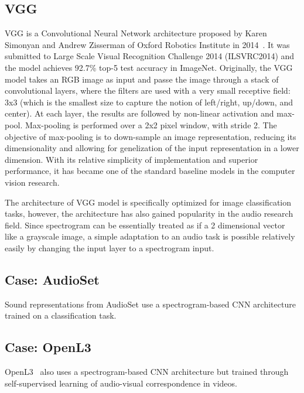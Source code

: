 
\subsection{VGG}
VGG is a Convolutional Neural Network architecture proposed by Karen Simonyan and Andrew Zisserman of Oxford Robotics Institute in 2014~\cite{simonyan2015}. It was submitted to Large Scale Visual Recognition Challenge 2014 (ILSVRC2014) and the model achieves 92.7\% top-5 test accuracy in ImageNet.
Originally, the VGG model takes an RGB image as input and passe the image through a stack of convolutional layers, where the filters are used with a very small receptive field: 3x3 (which is the smallest size to capture the notion of left/right, up/down, and center). At each layer, the results are followed by non-linear activation and max-pool. Max-pooling is performed over a 2x2 pixel window, with stride 2. The objective of max-pooling is to down-sample an image representation, reducing its dimensionality and allowing for genelization of the input representation in a lower dimension.
With its relative simplicity of implementation and superior performance, it has became one of the standard baseline models in the computer vision research.

The architecture of VGG model is specifically optimized for image classification tasks, however, the architecture has also gained popularity in the audio research field. Since spectrogram can be essentially treated as if a 2 dimensional vector like a grayscale image, a simple adaptation to an audio task is possible relatively easily by changing the input layer to a spectrogram input.

\subsection{Case: AudioSet}
Sound representations  from AudioSet \cite{jort2017} use a spectrogram-based CNN architecture trained on a classification task.

\subsection{Case: OpenL3}
OpenL3~\cite{cramer2019} also uses a spectrogram-based CNN architecture but trained through self-supervised learning of audio-visual correspondence in videos.

